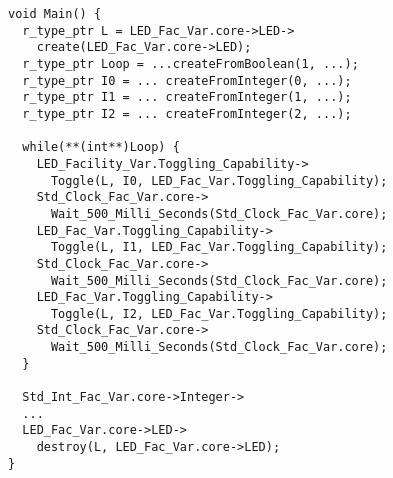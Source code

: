 

\begin{figure}
\begin{verbatim}
void Main() {
  r_type_ptr L = LED_Fac_Var.core->LED->
    create(LED_Fac_Var.core->LED);
  r_type_ptr Loop = ...createFromBoolean(1, ...);
  r_type_ptr I0 = ... createFromInteger(0, ...);
  r_type_ptr I1 = ... createFromInteger(1, ...);
  r_type_ptr I2 = ... createFromInteger(2, ...);
	
  while(**(int**)Loop) {
    LED_Facility_Var.Toggling_Capability->
      Toggle(L, I0, LED_Fac_Var.Toggling_Capability);
    Std_Clock_Fac_Var.core->
      Wait_500_Milli_Seconds(Std_Clock_Fac_Var.core);
    LED_Fac_Var.Toggling_Capability->
      Toggle(L, I1, LED_Fac_Var.Toggling_Capability);
    Std_Clock_Fac_Var.core->
      Wait_500_Milli_Seconds(Std_Clock_Fac_Var.core);
    LED_Fac_Var.Toggling_Capability->
      Toggle(L, I2, LED_Fac_Var.Toggling_Capability);
    Std_Clock_Fac_Var.core->
      Wait_500_Milli_Seconds(Std_Clock_Fac_Var.core);
  }

  Std_Int_Fac_Var.core->Integer->
  ...
  LED_Fac_Var.core->LED->
    destroy(L, LED_Fac_Var.core->LED);
}
\end{verbatim}
\label{fig:loop}
\end{figure}

